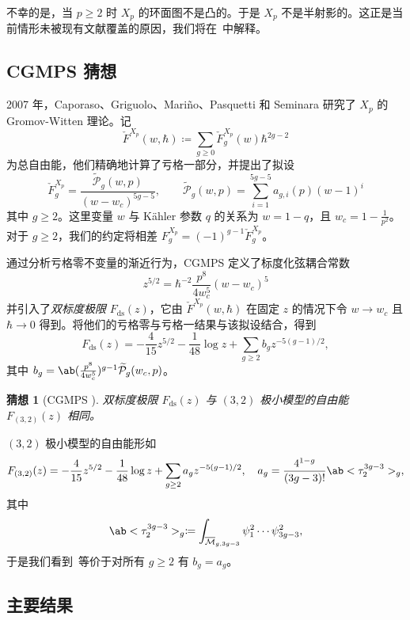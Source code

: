 \documentclass{amsart}
\newtheorem{conj}[thm]{猜想}
\theoremstyle{definition}
\theoremstyle{remark}
\theoremstyle{plain}
\theoremstyle{definition}
\theoremstyle{remark}
\newcommand{\Mbar}{\overline{\mathcal{M}}}
\newcommand{\mc}[1]{\mathcal{#1}}
\newcommand{\mr}[1]{\mathrm{#1}}
\newcommand{\wt}[1]{\widetilde{#1}}
\newcommand{\1}{\mathbf{1}}
\newcommand{\2}{\mathbf{2}}
\newcommand{\3}{\mathbf{3}}
\begin{document}
不幸的是，当 \(p \geq 2\) 时 \(X_p\) 的环面图不是凸的。于是 \(X_p\) 不是半射影的。这正是当前情形未被现有文献覆盖的原因，我们将在~中解释。

\subsection{CGMPS 猜想}%
\label{sub:The conjecture of CGMPS}

2007 年，Caporaso、Griguolo、Mari\~{n}o、Pasquetti 和 Seminara 研究了 \(X_p\) 的 Gromov-Witten 理论。记
\[ \check{F}^{X_p}(w,\hbar) \coloneqq \sum_{g \geq 0} \check{F}_g^{X_p}(w) \hbar^{2g-2} \]
为总自由能，他们精确地计算了亏格一部分，并提出了拟设
\begin{equation}\label{eqn:cgmps ansatz}
    \check{F}_g^{X_p} = \frac{\wt{\mc{P}}_g(w,p)}{(w-w_c)^{5g-5}}, \qquad \wt{\mc{P}}_g(w,p) = \sum_{i=1}^{5g-5} a_{g,i}(p)(w-1)^i
\end{equation}
其中 \(g \geq 2\)。这里变量 \(w\) 与 Kähler 参数 \(q\) 的关系为 \(w = 1-q\)，且 \(w_c = 1 - \frac{1}{p^2}\)。对于 \(g \geq 2\)，我们的约定将相差 \(F_g^{X_p} = (-1)^{g-1}\check{F}_g^{X_p}\)。

通过分析亏格零不变量的渐近行为，CGMPS 定义了标度化弦耦合常数
\[ z^{5/2} = \hbar^{-2} \frac{p^8}{4w_c^5}(w-w_c)^5 \]
并引入了\textit{双标度极限} \(F_{\mr{ds}}(z)\)，它由 \(\check{F}^{X_p}(w,\hbar)\) 在固定 \(z\) 的情况下令 \(w \to w_c\) 且 \(\hbar \to 0\) 得到。将他们的亏格零与亏格一结果与该拟设结合，得到
\[ F_{\mr{ds}}(z) = -\frac{4}{15}z^{5/2} - \frac{1}{48}\log z + \sum_{g \geq 2} b_g z^{-5(g-1)/2}, \]
其中 \(b_g = \ab(\frac{p^8}{4w_c^5})^{g-1}\wt{\mc{P}}_g(w_c,p)\)。

\begin{conj}[CGMPS {\cite{CGMPS2007}}]%
\label{conj:cgmps}
    双标度极限 \(F_{\mr{ds}}(z)\) 与 \((3,2)\) 极小模型的自由能 \(F_{(3,2)}(z)\) 相同。
\end{conj}

\((3,2)\) 极小模型的自由能形如
\[ F_{(3,2)}(z) = -\frac{4}{15}z^{5/2} - \frac{1}{48}\log z + \sum_{g\geq2} a_g z^{-5(g-1)/2}, \quad a_g = \frac{4^{1-g}}{(3g-3)!}\ab<\tau_2^{3g-3}>_g, \]
其中
\[ \ab<\tau_2^{3g-3}>_g \coloneqq \int_{\Mbar_{g,3g-3}} \psi_1^2 \cdots \psi_{3g-3}^2, \]
于是我们看到~等价于对所有 \(g \geq 2\) 有 \(b_g = a_g\)。

\subsection{主要结果}%
\label{sub:The main results (Guo local P1)}
\end{document}
